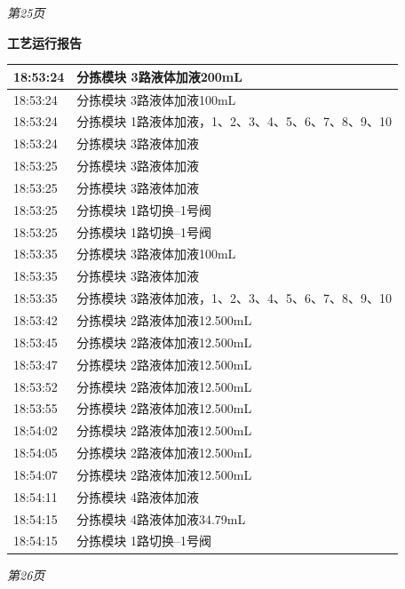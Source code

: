 \documentclass[UTF8,10pt,a4paper,fontset=fandol]{ctexart}
\begin{document}
\begin{center}
\begin{minipage}[t]{0.47\linewidth}
\smallskip
\textit{第25页}
\end{minipage}
\hfill
\begin{minipage}[t]{0.47\linewidth}
\centering
\textbf{工艺运行报告}

\smallskip
\scriptsize
\begin{tabular}{|p{1.25cm}|p{5.35cm}|}
\hline
18:53:24 & 分拣模块 3路液体加液200mL \\
\hline
18:53:24 & 分拣模块 3路液体加液100mL \\
\hline
18:53:24 & 分拣模块 1路液体加液，1、2、3、4、5、6、7、8、9、10 \\
\hline
18:53:24 & 分拣模块 3路液体加液 \\
\hline
18:53:25 & 分拣模块 3路液体加液 \\
\hline
18:53:25 & 分拣模块 3路液体加液 \\
\hline
18:53:25 & 分拣模块 1路切换--1号阀 \\
\hline
18:53:25 & 分拣模块 1路切换--1号阀 \\
\hline
18:53:35 & 分拣模块 3路液体加液100mL \\
\hline
18:53:35 & 分拣模块 3路液体加液 \\
\hline
18:53:35 & 分拣模块 3路液体加液，1、2、3、4、5、6、7、8、9、10 \\
\hline
18:53:42 & 分拣模块 2路液体加液12.500mL \\
\hline
18:53:45 & 分拣模块 2路液体加液12.500mL \\
\hline
18:53:47 & 分拣模块 2路液体加液12.500mL \\
\hline
18:53:52 & 分拣模块 2路液体加液12.500mL \\
\hline
18:53:55 & 分拣模块 2路液体加液12.500mL \\
\hline
18:54:02 & 分拣模块 2路液体加液12.500mL \\
\hline
18:54:05 & 分拣模块 2路液体加液12.500mL \\
\hline
18:54:07 & 分拣模块 2路液体加液12.500mL \\
\hline
18:54:11 & 分拣模块 4路液体加液 \\
\hline
18:54:15 & 分拣模块 4路液体加液34.79mL \\
\hline
18:54:15 & 分拣模块 1路切换--1号阀 \\
\hline
\end{tabular}

\smallskip
\textit{第26页}
\end{minipage}

\vspace{1em}


\end{center}
\end{document}
